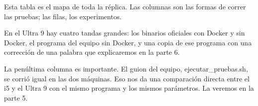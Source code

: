 Esta tabla es el mapa de toda la réplica. Las columnas son las formas de correr las pruebas; las filas, los experimentos.

En el Ultra 9 hay cuatro tandas grandes: los binarios oficiales con Docker y sin Docker, el programa del equipo sin Docker, y una copia de ese programa con una corrección de una palabra que explicaremos en la parte 6.

La penúltima columna es importante. El guion del equipo, ejecutar\_pruebas.sh, se corrió igual en las dos máquinas. Eso nos da una comparación directa entre el i5 y el Ultra 9 con el mismo programa y los mismos parámetros. La veremos en la parte 5.
